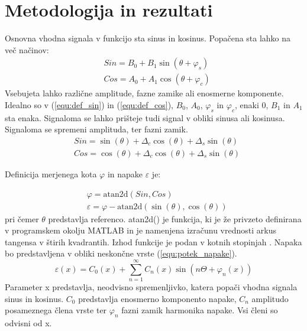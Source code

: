 \documentclass[a4paper]{article}
\begin{document}
\section{Metodologija in rezultati}

Osnovna vhodna signala v funkcijo sta sinus in kosinus. Popačena sta lahko na več načinov:
\begin{eqnarray}
\label{equ:def_sin}
&Sin = B_{0} + B_1 \sin(\theta + \varphi_{s})\\
\label{equ:def_cos}
&Cos = A_{0} + A_1 \cos(\theta + \varphi_{c})
\end{eqnarray}
Vsebujeta lahko različne amplitude, fazne zamike ali enosmerne komponente. Idealno so v (\ref{equ:def_sin}) in (\ref{equ:def_cos}), $B_0$, $A_0$, $\varphi_{s}$ in $\varphi_{c}$, enaki 0, $B_1$ in $A_1$ sta enaka. Signaloma se lahko prišteje tudi signal v obliki sinusa ali kosinusa. Signaloma se spremeni amplituda, ter fazni zamik.
\begin{eqnarray}
\label{equ:def_eks_sin}
&Sin = \sin(\theta)+\Delta_c \cos(\theta)+\Delta_s \sin(\theta)\\
\label{equ:def_ek_cos}
&Cos =\cos(\theta)+\Delta_c \cos(\theta)+\Delta_s \sin(\theta)
\end{eqnarray}

Definicija merjenega kota $\varphi$ in  napake $\varepsilon$ je:

\begin{eqnarray}
\label{equ:def_kot}
&\varphi = \mathrm{atan2d}(Sin,Cos)\\
\label{equ:def_err}
&\varepsilon =\varphi - \mathrm{atan2d}(\sin(\theta),\cos(\theta))
\end{eqnarray}
pri čemer $\theta$ predstavlja referenco. atan2d() je funkcija, ki je že privzeto definirana v programskem okolju MATLAB in je namenjena izračunu vrednosti arkus tangensa v štirih kvadrantih. Izhod funkcije je podan v kotnih stopinjah \cite{atand}.
Napaka bo predstavljena v obliki neskončne vrste (\ref{equ:potek_napake}).
\begin{equation}
\label{equ:potek_napake}
\varepsilon(x) = C_0(x) + \sum_{n=1}^{\infty} C_n(x) \sin(n \Theta+ \varphi_n(x))
\end{equation}
Parameter x predstavlja, neodvisno spremenljivko, katera popači vhodna signala sinus in kosinus. $C_0$ predstavlja enosmerno komponento napake, $C_n$ amplitudo posameznega člena vrste ter $\varphi_n$ fazni zamik harmonika napake. Vsi členi so odvisni od x.
\end{document}
